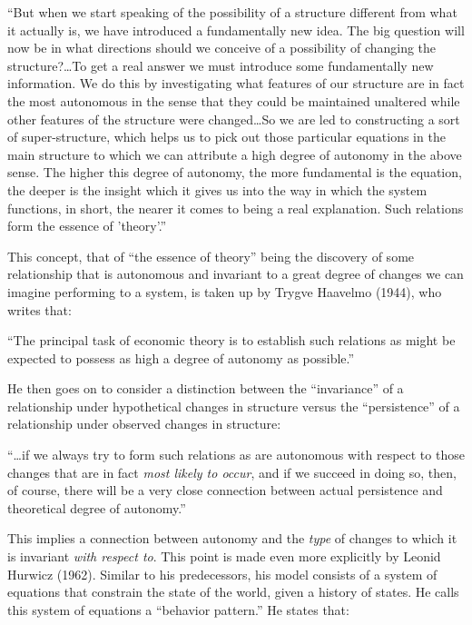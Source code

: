 \documentclass[a4paper,12pt]{article}
\begin{document}
\begin{displayquote}
``But when we start speaking of the possibility of a structure different from what it actually is, we have introduced a fundamentally new idea. The big question will now be in what directions should we conceive of a possibility of changing the structure?\ldots To get a real answer we must introduce some fundamentally new information. We do this by investigating what features of our structure are in fact the most autonomous in the sense that they could be maintained unaltered while other features of the structure were changed\ldots So we are led to constructing a sort of super-structure, which helps us to pick out those particular equations in the main structure to which we can attribute a high degree of autonomy in the above sense. The higher this degree of autonomy, the more fundamental is the equation, the deeper is the insight which it gives us into the way in which the system functions, in short, the nearer it comes to being a real explanation. Such relations form the essence of 'theory'.''
\end{displayquote}

This concept, that of ``the essence of theory'' being the discovery of some relationship that is autonomous and invariant to a great degree of changes we can imagine performing to a system, is taken up by Trygve Haavelmo (1944), who writes that: 

\begin{displayquote}
``The principal task of economic theory is to establish such relations as might be expected to possess as high a degree of autonomy as possible.''  
\end{displayquote}

He then goes on to consider a distinction between the ``invariance'' of a relationship under hypothetical changes in structure versus the ``persistence'' of a relationship under observed changes in structure:

\begin{displayquote}
``\ldots if we always try to form such relations as are autonomous with respect to those changes that are in fact \textit{most likely to occur}, and if we succeed in doing so, then, of course, there will be a very close connection between actual persistence and theoretical degree of autonomy.''
\end{displayquote}

This implies a connection between autonomy and the \textit{type} of changes to which it is invariant \textit{with respect to}. This point is made even more explicitly by Leonid Hurwicz (1962). Similar to his predecessors, his model consists of a system of equations that constrain the state of the world, given a history of states. He calls this system of equations a ``behavior pattern.'' He states that: 
\end{document}
